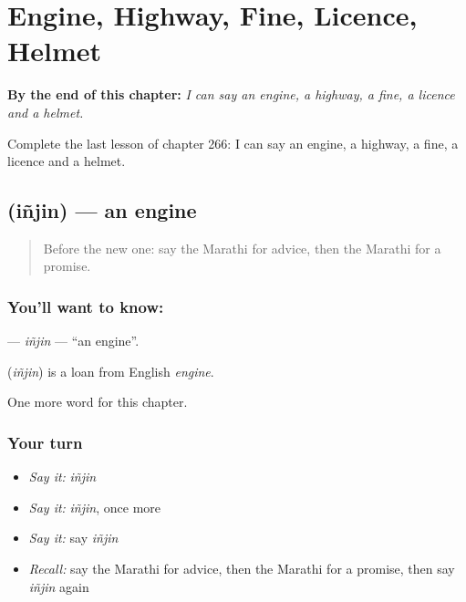 
\chapter{Engine, Highway, Fine, Licence, Helmet}
\label{ch:mr-engine-highway-fine-licence-helmet}

\begin{chapteropening}
\textbf{By the end of this chapter:} \emph{I can say an engine, a highway, a fine, a licence and a helmet.}

Complete the last lesson of chapter 266: I can say an engine, a highway, a fine, a licence and a helmet.
\end{chapteropening}

\section[\texorpdfstring{\mr{इंजिन} (iñjin)}{इंजिन (iñjin)}]{ (iñjin) — an engine}

\label{lesson:MR-C266-injin}



\begin{quote}
Before the new one: say the Marathi for advice, then the Marathi for a promise.
\end{quote}

\subsection*{You'll want to know: }
\textbf{} — \emph{iñjin} — \textquotedblleft{}an engine\textquotedblright{}.

\begin{cousinweb}
\textbf{} (\emph{iñjin}) is a loan from English \emph{engine}.
\end{cousinweb}

\begin{grammarlens}[title={What you've built}]
One more word for this chapter.
\end{grammarlens}

\subsection*{Your turn}
\begin{itemize}
\raggedright
  \item \emph{Say it:} \emph{iñjin}
  \item \emph{Say it:} \emph{iñjin}, once more
  \item \emph{Say it:} say \emph{iñjin}
  \item \emph{Recall:} say the Marathi for advice, then the Marathi for a promise, then say \emph{iñjin} again
\end{itemize}

